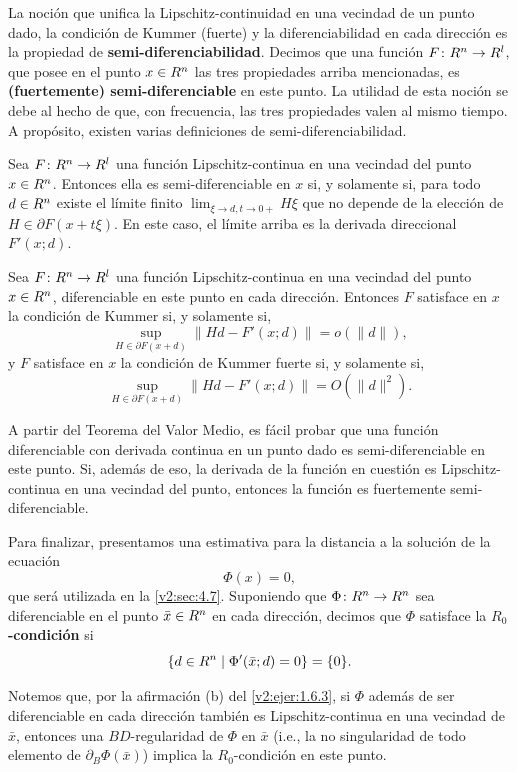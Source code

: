 La noción que unifica la Lipschitz-continuidad en una vecindad de un punto dado, la condición de Kummer (fuerte) y la diferenciabilidad en cada dirección es la propiedad de \textbf{semi-diferenciabilidad}. Decimos que una función $F \colon R^n \to R^l$, que posee en el punto $x \in R^n$ las tres propiedades arriba mencionadas, es \textbf{(fuertemente) semi-diferenciable} en este punto. La utilidad de esta noción se debe al hecho de que, con frecuencia, las tres propiedades valen al mismo tiempo. A propósito, existen varias definiciones de semi-diferenciabilidad.

\begin{theorem}\label{v2:thm:1.6.4}
    Sea $F \colon R^n \to R^l$ una función Lipschitz-continua en una vecindad del punto $x \in R^n$.
    Entonces ella es semi-diferenciable en $x$ si, y solamente si, para todo $d \in R^n$ existe el límite finito $\lim_{\xi \to d, t \to 0+} H\xi$ que no depende de la elección de $H \in \partial F(x+t\xi)$. En este caso, el límite arriba es la derivada direccional $F'(x; d)$.
\end{theorem}

\begin{theorem}\label{v2:thm:1.6.5}
    Sea $F \colon R^n \to R^l$ una función Lipschitz-continua en una vecindad del punto $x \in R^n$, diferenciable en este punto en cada dirección.
    Entonces $F$ satisface en $x$ la condición de Kummer si, y solamente si,
    \[
        \sup_{H \in \partial F(x+d)} \|Hd - F'(x; d)\| = o(\|d\|),
    \]
    y $F$ satisface en $x$ la condición de Kummer fuerte si, y solamente si,
    \[
        \sup_{H \in \partial F(x+d)} \|Hd - F'(x; d)\| = O(\|d\|^2).
    \]
\end{theorem}

A partir del Teorema del Valor Medio, es fácil probar que una función diferenciable con derivada continua en un punto dado es semi-diferenciable en este punto. Si, además de eso, la derivada de la función en cuestión es Lipschitz-continua en una vecindad del punto, entonces la función es fuertemente semi-diferenciable.

Para finalizar, presentamos una estimativa para la distancia a la solución de la ecuación
\[
    \Phi(x) = 0,
\]
que será utilizada en la \cref{v2:sec:4.7}. Suponiendo que $\Phi \colon R^n \to R^n$ sea diferenciable en el punto $\bar{x} \in R^n$ en cada dirección, decimos que $\Phi$ satisface la \textbf{$R_0$-condición} si
\[
    \{d \in R^n \mid \Phi'(\bar{x}; d) = 0\} = \{0\}.
\]

Notemos que, por la afirmación (b) del \cref{v2:ejer:1.6.3}, si $\Phi$ además de ser diferenciable en cada dirección también es Lipschitz-continua en una vecindad de $\bar{x}$, entonces una $BD$-regularidad de $\Phi$ en $\bar{x}$ (i.e., la no singularidad de todo elemento de $\partial_B \Phi(\bar{x})$) implica la $R_0$-condición en este punto.


